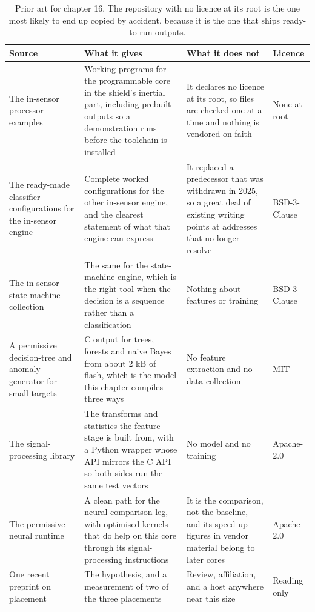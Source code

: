 \begin{table}[H]\centering\small
\begin{tabular}{p{34mm}p{46mm}p{38mm}p{20mm}}
\toprule
Source & What it gives & What it does not & Licence \\
\midrule
The in-sensor processor examples & Working programs for the programmable core in the shield's inertial part, including prebuilt outputs so a demonstration runs before the toolchain is installed & It declares no licence at its root, so files are checked one at a time and nothing is vendored on faith & None at root \\
The ready-made classifier configurations for the in-sensor engine & Complete worked configurations for the other in-sensor engine, and the clearest statement of what that engine can express & It replaced a predecessor that was withdrawn in 2025, so a great deal of existing writing points at addresses that no longer resolve & BSD-3-Clause \\
The in-sensor state machine collection & The same for the state-machine engine, which is the right tool when the decision is a sequence rather than a classification & Nothing about features or training & BSD-3-Clause \\
A permissive decision-tree and anomaly generator for small targets & C output for trees, forests and naive Bayes from about 2 kB of flash, which is the model this chapter compiles three ways & No feature extraction and no data collection & MIT \\
The signal-processing library & The transforms and statistics the feature stage is built from, with a Python wrapper whose API mirrors the C API so both sides run the same test vectors & No model and no training & Apache-2.0 \\
The permissive neural runtime & A clean path for the neural comparison leg, with optimised kernels that do help on this core through its signal-processing instructions & It is the comparison, not the baseline, and its speed-up figures in vendor material belong to later cores & Apache-2.0 \\
One recent preprint on placement & The hypothesis, and a measurement of two of the three placements & Review, affiliation, and a host anywhere near this size & Reading only \\
\bottomrule
\end{tabular}
\caption{Prior art for chapter 16. The repository with no licence at its root is the one most likely to end up copied by accident, because it is the one that ships ready-to-run outputs.}
\end{table}

